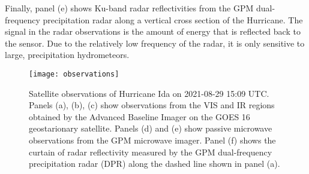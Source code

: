 Finally, panel (e) shows Ku-band radar reflectivities from the GPM
dual-frequency precipitation radar along a vertical cross section of the
Hurricane. The signal in the radar observations is the amount of energy that is
reflected back to the sensor. Due to the relatively low frequency of the
radar, it is only sensitive to large, precipitation hydrometeors.


\begin{figure}
  \centering
\texttt{[image: observations]}
\caption{Satellite observations of Hurricane Ida on 2021-08-29 15:09 UTC.
  Panels (a), (b), (c) show observations from the VIS and IR regions obtained
  by the Advanced Baseline Imager on the GOES 16 geostarionary satellite.
  Panels (d) and (e) show passive microwave observations from the GPM microwave
  imager. Panel (f) shows the curtain of radar reflectivity measured by the GPM dual-frequency
  precipitation radar (DPR) along the dashed line shown in panel (a).}
\label{fig:radiative_transfer:observations}
\end{figure}
